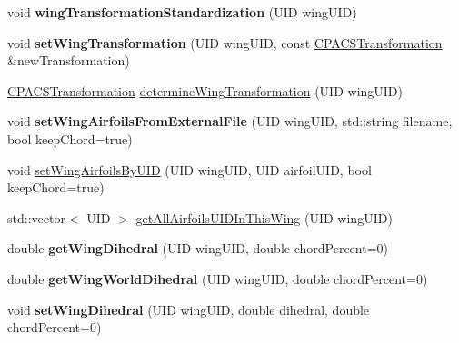 \begin{DoxyCompactItemize}
\item 
\hypertarget{classcpcr_1_1AircraftTree_aa3e27822a55e68d2c181a9fc626a0dcc}{void {\bfseries wing\-Transformation\-Standardization} (U\-I\-D wing\-U\-I\-D)}\label{classcpcr_1_1AircraftTree_aa3e27822a55e68d2c181a9fc626a0dcc}

\item 
\hypertarget{classcpcr_1_1AircraftTree_ade78abd6bb2b9ceedb5b86f0c167d598}{void {\bfseries set\-Wing\-Transformation} (U\-I\-D wing\-U\-I\-D, const \hyperlink{classcpcr_1_1CPACSTransformation}{C\-P\-A\-C\-S\-Transformation} \&new\-Transformation)}\label{classcpcr_1_1AircraftTree_ade78abd6bb2b9ceedb5b86f0c167d598}

\item 
\hyperlink{classcpcr_1_1CPACSTransformation}{C\-P\-A\-C\-S\-Transformation} \hyperlink{classcpcr_1_1AircraftTree_a1089f2cb81eed5db7f52c6342454ce5d}{determine\-Wing\-Transformation} (U\-I\-D wing\-U\-I\-D)
\item 
\hypertarget{classcpcr_1_1AircraftTree_a412b79ab38ba02069ea6fc68b433a77e}{void {\bfseries set\-Wing\-Airfoils\-From\-External\-File} (U\-I\-D wing\-U\-I\-D, std\-::string filename, bool keep\-Chord=true)}\label{classcpcr_1_1AircraftTree_a412b79ab38ba02069ea6fc68b433a77e}

\item 
void \hyperlink{classcpcr_1_1AircraftTree_afbbf121d2483d8fc793adeb4b22a5f59}{set\-Wing\-Airfoils\-By\-U\-I\-D} (U\-I\-D wing\-U\-I\-D, U\-I\-D airfoil\-U\-I\-D, bool keep\-Chord=true)
\item 
std\-::vector$<$ U\-I\-D $>$ \hyperlink{classcpcr_1_1AircraftTree_a6b7f9872f9a86e61ab998cc0e223972c}{get\-All\-Airfoils\-U\-I\-D\-In\-This\-Wing} (U\-I\-D wing\-U\-I\-D)
\item 
\hypertarget{classcpcr_1_1AircraftTree_a835d9dc570b3a85c4e15b367f84e057e}{double {\bfseries get\-Wing\-Dihedral} (U\-I\-D wing\-U\-I\-D, double chord\-Percent=0)}\label{classcpcr_1_1AircraftTree_a835d9dc570b3a85c4e15b367f84e057e}

\item 
\hypertarget{classcpcr_1_1AircraftTree_a2e875be685e1c4a4b208d02b19dfc1f1}{double {\bfseries get\-Wing\-World\-Dihedral} (U\-I\-D wing\-U\-I\-D, double chord\-Percent=0)}\label{classcpcr_1_1AircraftTree_a2e875be685e1c4a4b208d02b19dfc1f1}

\item 
\hypertarget{classcpcr_1_1AircraftTree_a4f11293a49e122411433d0ce55783c47}{void {\bfseries set\-Wing\-Dihedral} (U\-I\-D wing\-U\-I\-D, double dihedral, double chord\-Percent=0)}\label{classcpcr_1_1AircraftTree_a4f11293a49e122411433d0ce55783c47}


\end{DoxyCompactItemize}
